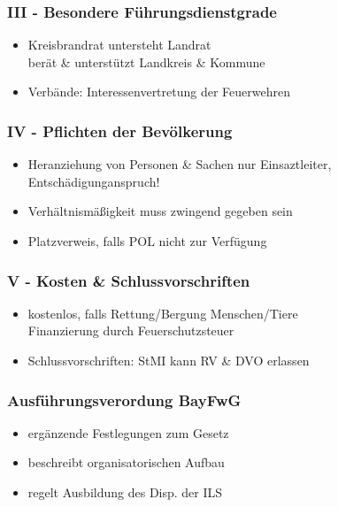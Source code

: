 \begin{normbox}{\subsubsection{III - Besondere Führungsdienstgrade}}
    \begin{itemize}
        \item Kreisbrandrat untersteht Landrat\\
        \ra berät \& unterstützt Landkreis \& Kommune
        \item Verbände: Interessenvertretung der Feuerwehren\\
    \end{itemize}
\end{normbox}
\begin{normbox}{\subsubsection{IV - Pflichten der Bevölkerung}}
    \begin{itemize}
        \item Heranziehung von Personen \& Sachen
        \ra nur Einsaztleiter, Entschädigunganspruch!\\
        \item Verhältnismäßigkeit muss zwingend gegeben sein
        \item Platzverweis, falls POL nicht zur Verfügung
    \end{itemize}
\end{normbox}
\begin{normbox}{\subsubsection{V - Kosten \& Schlussvorschriften}}
    \begin{itemize}
        \item kostenlos, falls Rettung/Bergung Menschen/Tiere\\
        \ra Finanzierung durch Feuerschutzsteuer
        \item Schlussvorschriften: StMI kann RV \& DVO erlassen
    \end{itemize}
\end{normbox}
\begin{normbox}{\subsubsection{Ausführungsverordung BayFwG}}
    \begin{itemize}
        \item ergänzende Festlegungen zum Gesetz
        \item beschreibt organisatorischen Aufbau
        \item regelt Ausbildung des Disp. der ILS
    \end{itemize}
\end{normbox}
